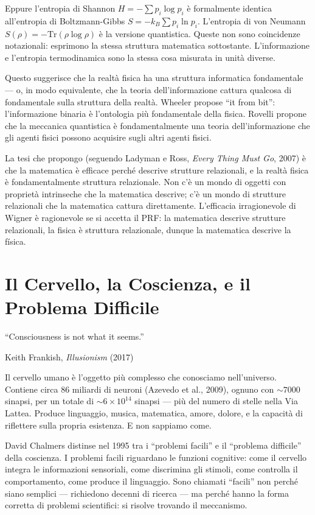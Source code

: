 \documentclass[11.5pt,a4paper,openany]{book}
\theoremstyle{remark}
\begin{document}
Eppure l'entropia di Shannon $H = -\sum p_i \log p_i$ è formalmente identica all'entropia di Boltzmann-Gibbs $S = -k_B \sum p_i \ln p_i$. L'entropia di von Neumann $S(\rho) = -\text{Tr}(\rho\log\rho)$ è la versione quantistica. Queste non sono coincidenze notazionali: esprimono la stessa struttura matematica sottostante. L'informazione e l'entropia termodinamica sono la stessa cosa misurata in unità diverse.

Questo suggerisce che la realtà fisica ha una struttura informatica fondamentale --- o, in modo equivalente, che la teoria dell'informazione cattura qualcosa di fondamentale sulla struttura della realtà. Wheeler propose ``it from bit'': l'informazione binaria è l'ontologia più fondamentale della fisica. Rovelli propone che la meccanica quantistica è fondamentalmente una teoria dell'informazione che gli agenti fisici possono acquisire sugli altri agenti fisici.

La tesi che propongo (seguendo Ladyman e Ross, \textit{Every Thing Must Go}, 2007) è che la matematica è efficace perché descrive strutture relazionali, e la realtà fisica è fondamentalmente struttura relazionale. Non c'è un mondo di oggetti con proprietà intrinseche che la matematica descrive; c'è un mondo di strutture relazionali che la matematica cattura direttamente. L'efficacia irragionevole di Wigner è ragionevole se si accetta il PRF: la matematica descrive strutture relazionali, la fisica è struttura relazionale, dunque la matematica descrive la física.

\chapter{Il Cervello, la Coscienza, e il Problema Difficile}

\epigraph{``Consciousness is not what it seems.''}{Keith Frankish, \textit{Illusionism} (2017)}

Il cervello umano è l'oggetto più complesso che conosciamo nell'universo. Contiene circa 86 miliardi di neuroni (Azevedo et al., 2009), ognuno con $\sim 7000$ sinapsi, per un totale di $\sim 6 \times 10^{14}$ sinapsi --- più del numero di stelle nella Via Lattea. Produce linguaggio, musica, matematica, amore, dolore, e la capacità di riflettere sulla propria esistenza. E non sappiamo come.

David Chalmers distinse nel 1995 tra i ``problemi facili'' e il ``problema difficile'' della coscienza. I problemi facili riguardano le funzioni cognitive: come il cervello integra le informazioni sensoriali, come discrimina gli stimoli, come controlla il comportamento, come produce il linguaggio. Sono chiamati ``facili'' non perché siano semplici --- richiedono decenni di ricerca --- ma perché hanno la forma corretta di problemi scientifici: si risolve trovando il meccanismo.
\end{document}
